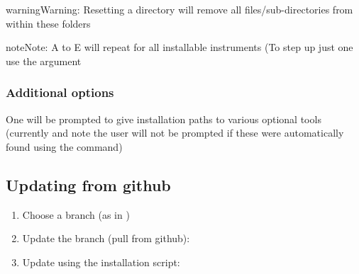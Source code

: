 \documentclass[a4paper,10pt,english]{report}
\begin{document}
\begin{sphinxadmonition}{warning}{Warning:}
Resetting a directory will remove all files/sub-directories from within these folders
\end{sphinxadmonition}

\begin{sphinxadmonition}{note}{Note:}
A to E will repeat for all installable instruments (To step up just one use the  argument
\end{sphinxadmonition}


\subsubsection{Additional options}
\label{\detokenize{user/general/installation:additional-options}}
One will be prompted to give installation paths to various optional tools (currently {\hyperref[\detokenize{misc/glossary:term-ds9}]{}}
and {\hyperref[\detokenize{misc/glossary:term-pdflatex}]{}}
note the user will not be prompted if these were automatically found using the 
command)


\subsection{Updating from github}
\label{\detokenize{user/general/installation:updating-from-github}}\label{\detokenize{user/general/installation:installation-update}}\begin{enumerate}
%
\item {} 
Choose a branch (as in {\hyperref[\detokenize{user/general/installation:installation-choose-branch}]{}})

\item {} 
Update the branch (pull from github):

\begin{sphinxVerbatim}[commandchars=\\\{\}]
    
\end{sphinxVerbatim}

\item {} 
Update using the installation script:

\begin{sphinxVerbatim}[commandchars=\\\{\}]
   
\end{sphinxVerbatim}

\end{enumerate}
\end{document}
